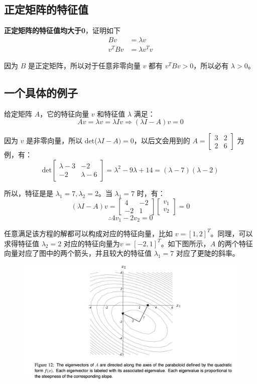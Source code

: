 \documentclass[12pt]{article}
\begin{document}
 \subsection{正定矩阵的特征值}
 \textbf{正定矩阵的特征值均大于0}，证明如下
\begin{align*}
Bv &= \lambda v \\
v^T B v &= \lambda v^T v
\end{align*}

因为 $B$ 是正定矩阵，所以对于任意非零向量 $v$ 都有 $v^T B v > 0$，所以必有 $\lambda > 0$。
 
\subsection{一个具体的例子}
给定矩阵 $A$，它的特征向量 $v$ 和特征值 $\lambda$ 满足：
$$
Av = \lambda v = \lambda Iv \Rightarrow (\lambda I - A) v = 0
$$

因为 $v$ 是非零向量，所以 det($\lambda I - A) = 0$，以后文会用到的 $A = \begin{bmatrix}3 & 2 \\ 2 & 6\end{bmatrix}$ 为例，有：
$$
\text{det}\begin{bmatrix}
\lambda - 3 & -2 \\ -2 & \lambda -6
\end{bmatrix} = \lambda^2 - 9\lambda + 14 = (\lambda - 7)(\lambda - 2)
$$

所以，特征是是 $\lambda_1 = 7, \lambda_2 = 2$。当 $\lambda_1 = 7$ 时，有：
$$
(\lambda I - A) v = \begin{bmatrix}4 & -2 \\ -2 & 1\end{bmatrix}\begin{bmatrix}v_1 \\ v_2 \end{bmatrix} = 0
$$
$$
\therefore 4v_1 - 2v_2 = 0
$$

任意满足该方程的解都可以构成对应的特征向量，比如 $v = [1, 2]^T$。同理，可以求得特征值 $\lambda_2 = 2$ 对应的特征向量为$v = [-2, 1]^T$。如下图所示，$A$ 的两个特征向量对应了图中的两个箭头，并且较大的特征值 $\lambda_1 = 7$ 对应了更陡的斜率。

\begin{figure}[H]
    \centering
    \includegraphics[width=1\textwidth]{fig/CG_Plot_Eightvalue_4.png}
\end{figure}
\end{document}
